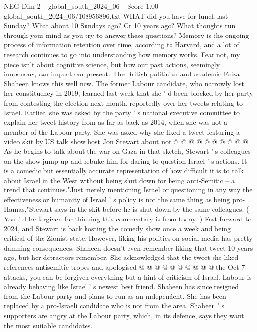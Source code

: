 \begin{textsample}{NEG Dim 2 – global\_south\_2024\_06 – Score 1.00 – global\_south\_2024\_06/108956896.txt}  \label{ex:f2_neg_331}
WHAT did you have for lunch last Sunday?
What about 10 Sundays ago?
Or 10 years ago?
What thoughts run through your mind as you try to answer these questions?
Memory is the ongoing process of information retention over time, according to Harvard, and a lot of research continues to go into understanding how memory works.
Fear not, my piece isn't about cognitive science, but how our past actions, seemingly innocuous, can impact our present.
The British politician and academic Faiza Shaheen knows this well now.
The former Labour candidate, who narrowly lost her constituency in 2019, learned last week that she ' d been blocked by her party from contesting the election next month, reportedly over her tweets relating to Israel.
Earlier, she was asked by the party ' s national executive committee to explain her tweet history from as far as back as 2014, when she was not a member of the Labour party.
She was asked why she liked a tweet featuring a video skit by US talk show host Jon Stewart about not @ @ @ @ @ @ @ @ @ @ As he begins to talk about the war on Gaza in that sketch, Stewart ' s colleagues on the show jump up and rebuke him for daring to question Israel ' s actions.
It is a comedic but essentially accurate representation of how difficult it is to talk about Israel in the West without being shut down for being anti-Semitic -- a trend that continues."Just merely mentioning Israel or questioning in any way the effectiveness or humanity of Israel ' s policy is not the same thing as being pro-Hamas,"Stewart says in the skit before he is shut down by the same colleagues. ( You ' d be forgiven for thinking this commentary is from today. ) Fast forward to 2024, and Stewart is back hosting the comedy show once a week and being critical of the Zionist state.
However, liking his politics on social media has pretty damning consequences.
Shaheen doesn't even remember liking that tweet 10 years ago, but her detractors remember.
She acknowledged that the tweet she liked references antisemitic tropes and apologised @ @ @ @ @ @ @ @ @ @ the Oct 7 attacks, you can be forgiven everything but a hint of criticism of Israel.
Labour is already behaving like Israel ' s newest best friend.
Shaheen has since resigned from the Labour party and plans to run as an independent.
She has been replaced by a pro-Israeli candidate who is not from the area.
Shaheen ' s supporters are angry at the Labour party, which, in its defence, says they want the most suitable candidates.

\end{textsample}
